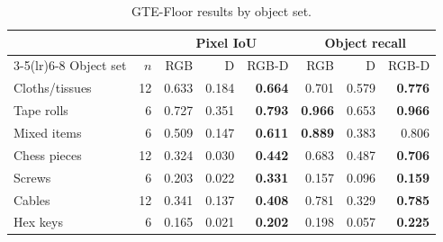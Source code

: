 \begin{table}[!t]
\caption{GTE-Floor results by object set.}
\label{tab:object-sets}
\centering\footnotesize
\setlength{\tabcolsep}{3pt}
\begin{tabular}{lr*{6}{r}}
\toprule
 & & \multicolumn{3}{c}{Pixel IoU} & \multicolumn{3}{c}{Object recall}\\
\cmidrule(lr){3-5}\cmidrule(lr){6-8}
Object set & $n$ & RGB & D & RGB-D & RGB & D & RGB-D\\
\midrule
Cloths/tissues & 12 & 0.633 & 0.184 & \textbf{0.664} & 0.701 & 0.579 & \textbf{0.776}\\
Tape rolls & 6 & 0.727 & 0.351 & \textbf{0.793} & \textbf{0.966} & 0.653 & \textbf{0.966}\\
Mixed items & 6 & 0.509 & 0.147 & \textbf{0.611} & \textbf{0.889} & 0.383 & 0.806\\
Chess pieces & 12 & 0.324 & 0.030 & \textbf{0.442} & 0.683 & 0.487 & \textbf{0.706}\\
Screws & 6 & 0.203 & 0.022 & \textbf{0.331} & 0.157 & 0.096 & \textbf{0.159}\\
Cables & 12 & 0.341 & 0.137 & \textbf{0.408} & 0.781 & 0.329 & \textbf{0.785}\\
Hex keys & 6 & 0.165 & 0.021 & \textbf{0.202} & 0.198 & 0.057 & \textbf{0.225}\\
\bottomrule
\end{tabular}\par{}
\end{table}
